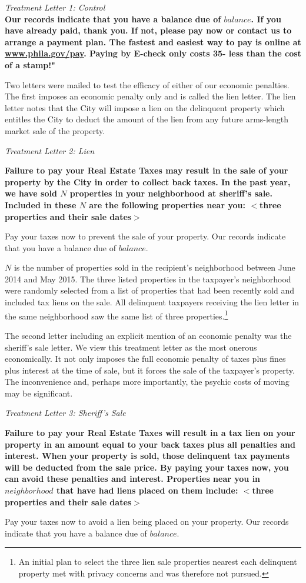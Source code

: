 \documentclass[12pt]{article}
\begin{document}
{\it Treatment Letter 1: Control } \\ {\bf Our records indicate that
  you have a balance due of $balance$.  If you have already paid,
  thank you. If not, please pay now or contact us to arrange a payment
  plan. The fastest and easiest way to pay is online at
  \underline{www.phila.gov/pay}. Paying by E-check only costs 35\textcent -
  less than the cost of a stamp!"}

Two letters were mailed to test the efficacy of either of our 
economic penalties.  The first imposes an economic penalty only and is
called the lien letter.  The lien letter notes that the City will
impose a lien on the delinquent property which entitles the City to
deduct the amount of the lien from any future arms-length market sale
of the property.
        
{\it Treatment Letter 2: Lien } \\ {\bf Failure to pay your Real
  Estate Taxes may result in the sale of your property by the City in
  order to collect back taxes. In the past year, we have sold $N$
  properties in your neighborhood at sheriff's sale. Included in these
  $N$ are the following properties near you: $<$three properties and
  their sale dates$>$

  Pay your taxes now to prevent the sale of your property.  Our
  records indicate that you have a balance due of $balance$.}

$N$ is the number of properties sold in the recipient's neighborhood between June 2014
and May 2015. The three listed properties in the taxpayer's
neighborhood were randomly selected from a list of properties that had
been recently sold and included tax liens on the sale.  All delinquent
taxpayers receiving the lien letter in the same neighborhood saw
the same list of three properties.\footnote{An initial plan to select
  the three lien sale properties nearest each delinquent property met
  with privacy concerns and was therefore not pursued.}

The second letter including an explicit mention of an economic penalty
was the sheriff's sale letter.  We view this treatment letter as the
most onerous economically.  It not only imposes the full economic
penalty of taxes plus fines plus interest at the time of sale, but it
forces the sale of the taxpayer's property.  The inconvenience and,
perhaps more importantly, the psychic costs of moving may be
significant.  
  
{\it Treatment Letter 3: Sheriff's Sale} \\ {\bf Failure to pay your
  Real Estate Taxes will result in a tax lien on your property in an
  amount equal to your back taxes plus all penalties and
  interest. When your property is sold, those delinquent tax payments
  will be deducted from the sale price. By paying your taxes now, you
  can avoid these penalties and interest. Properties near you in
  $neighborhood$ that have had liens placed on them include: $<$three
  properties and their sale dates$>$

  Pay your taxes now to avoid a lien being placed on your property.
  Our records indicate that you have a balance due of $balance$.}
  
\end{document}
